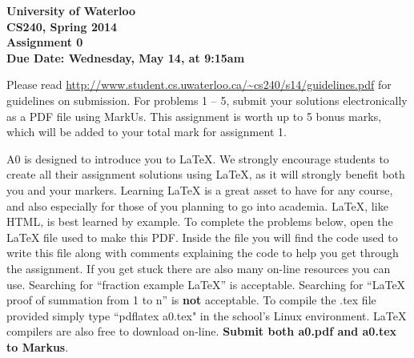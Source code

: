 \documentclass[12pt]{article}
\begin{document}
\begin{center}
{\Large\bf University of Waterloo}\\
\vspace{3mm}
{\Large\bf CS240, Spring 2014}\\
\vspace{2mm}
{\Large\bf Assignment 0}\\
\vspace{3mm}
\textbf{Due Date: Wednesday, May 14, at 9:15am}
\end{center}

\def\question#1{\item[\bf #1.]}
\def\part#1{\item[\bf #1)]}
\newcommand{\pc}[1]{\mbox{\textbf{#1}}} %

Please read
\url{http://www.student.cs.uwaterloo.ca/~cs240/s14/guidelines.pdf}
for guidelines on submission.  For problems 1 -- 5, submit your
solutions electronically as a PDF file using MarkUs.
This assignment is worth up to 5 bonus marks, which will be added to
your total mark for assignment 1.


A0 is designed to introduce you to \LaTeX{}.
We strongly encourage students to create all their assignment solutions using \LaTeX{},
as it will strongly benefit both you and your markers. Learning \LaTeX{} is a great asset 
to have for any course, and also especially for those of you planning to go into academia.
\LaTeX{}, like HTML, is best learned by example. To complete the problems below, open the 
\LaTeX{} file used to make this PDF. Inside the file you will find the code used to write this
file along with comments explaining the code to help you get through the assignment. If you get
stuck there are also many on-line resources you can use. Searching for ``fraction example \LaTeX{}'' 
is acceptable. Searching for ``\LaTeX{} proof of summation from 1 to n'' 
is {\bf not} acceptable. To compile the .tex file provided simply type ``pdflatex a0.tex" 
in the school's Linux environment. \LaTeX{}  compilers are also free to download on-line.
{\bf Submit both a0.pdf and a0.tex to Markus}.
\end{document}
